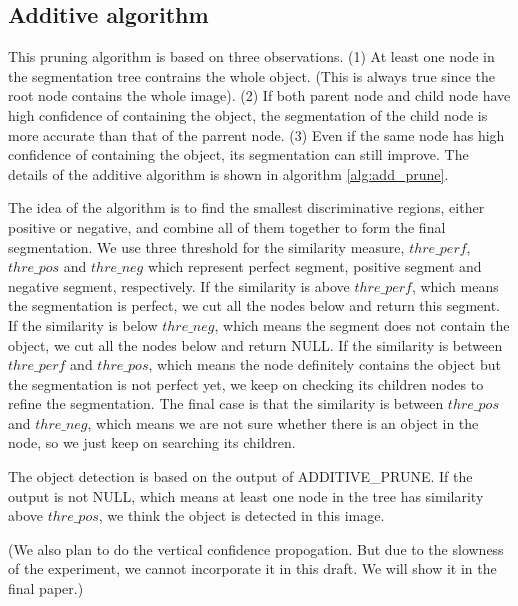 \documentclass[10pt,twocolumn,letterpaper]{article}
\begin{document}
\subsection{Additive algorithm}
\label{ssec:additive}

This pruning algorithm is based on three observations. (1) At least one node in the segmentation tree contrains the whole object. (This is always true since the root node contains the whole image). (2) If both parent node and child node have high confidence of containing the object, the segmentation of the child node is more accurate than that of the parrent node. (3) Even if the same node has high confidence of containing the object, its segmentation can still improve. The details of the additive algorithm is shown in algorithm \ref{alg:add_prune}.

The idea of the algorithm is to find the smallest discriminative regions, either positive or negative, and combine all of them together to form the final segmentation. We use three threshold for the similarity measure, $thre\_perf$, $thre\_pos$ and $thre\_neg$ which represent perfect segment, positive segment and negative segment, respectively. If the similarity is above $thre\_perf$, which means the segmentation is perfect, we cut all the nodes below and return this segment. If the similarity is below $thre\_neg$, which means the segment does not contain the object, we cut all the nodes below and return NULL. If the similarity is between $thre\_perf$ and $thre\_pos$, which means the node definitely contains the object but the segmentation is not perfect yet, we keep on checking its children nodes to refine the segmentation. The final case is that the similarity is between $thre\_pos$ and $thre\_neg$, which means we are not sure whether there is an object in the node, so we just keep on searching its children. 

The object detection is based on the output of ADDITIVE\_PRUNE. If the output is not NULL, which means at least one node in the tree has similarity above $thre\_pos$, we think the object is detected in this image.

(We also plan to do the vertical confidence propogation. But due to the slowness of the experiment, we cannot incorporate it in this draft. We will show it in the final paper.)
\end{document}
